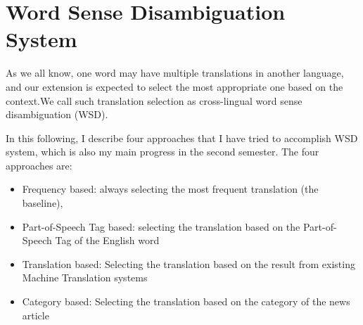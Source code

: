 \section{Word Sense Disambiguation System}
\begin{CJK}{UTF8}{gbsn}
As we all know, one word may have multiple translations in another language, and our extension is expected to select the most appropriate one based on the context.We call such translation selection as cross-lingual word sense disambiguation (WSD).

In this following, I describe four approaches that I have tried to accomplish WSD system, which is also my main progress in the second semester. The four approaches are: 

\begin{itemize}
\item Frequency based: always selecting the most frequent translation (the baseline),
\item Part-of-Speech Tag based: selecting the translation based on the Part-of-Speech Tag of the English word
\item Translation based: Selecting the translation based on the result from existing Machine Translation systems
\item Category based: Selecting the translation based on the category of the news article
\end{itemize}

                                                         

\end{CJK}
